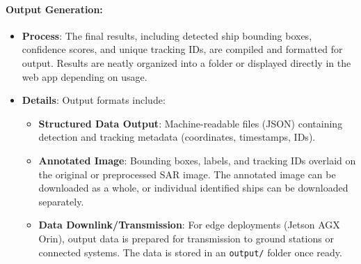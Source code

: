 \documentclass{article}
\begin{document}
\paragraph{Output Generation:}
\begin{itemize}
	\item \textbf{Process}: The final results, including detected ship bounding boxes, confidence scores, and unique tracking IDs, are compiled and formatted for output. Results are neatly organized into a folder or displayed directly in the web app depending on usage.
	
	\item \textbf{Details}: Output formats include:
	\begin{itemize}
		\item \textbf{Structured Data Output}: Machine-readable files (JSON) containing detection and tracking metadata (coordinates, timestamps, IDs).
		\item \textbf{Annotated Image}: Bounding boxes, labels, and tracking IDs overlaid on the original or preprocessed SAR image. The annotated image can be downloaded as a whole, or individual identified ships can be downloaded separately.
		\item \textbf{Data Downlink/Transmission}: For edge deployments (Jetson AGX Orin), output data is prepared for transmission to ground stations or connected systems. The data is stored in an \texttt{output/} folder once ready.
	\end{itemize}
\end{itemize}
\end{document}
